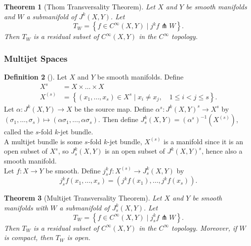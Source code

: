 \documentclass[reqno]{amsart}
\newtheorem{theorem}{Theorem}[section]
\theoremstyle{definition}
\newtheorem{definition}[theorem]{Definition}
\theoremstyle{remark}
\begin{document}
\begin{theorem}[Thom Transversality Theorem]
    Let $X$ and $Y$ be smooth manifolds and
    $W$ a submanifold of $J^{k}(X,Y)$. Let
    \[
    T_W = \left\{ f \in
    C^{\infty}(X,Y)  \mid j^{k}f \pitchfork W \right\} .
    \]
    Then $T_W$ is a residual subset of
    $C^{\infty}(X,Y)$ in the $C^{\infty}$ topology.
\end{theorem}



\subsubsection{Multijet Spaces}

\begin{definition}[]
Let $X$ and $Y$ be smooth manifolds.
Define
\begin{align*}
    X^{s} &= X \times \ldots \times X\\
    X^{(s)}
    &= \left\{ \left( x_1,\ldots,x_s \right)
    \in X^{s}  \mid x_i \neq x_j, \quad 1 \le i <j \le s\right\} .
\end{align*}
Let
$\alpha \colon J^{k}(X,Y) \to X$ be the source map.
Define
$\alpha^s \colon J^{k}(X,Y)^{s} \to X^{s}$
by $\left( \sigma_1,\ldots, \sigma_s \right)
\mapsto \left( \alpha \sigma_1, \ldots,
\alpha \sigma_s \right) $.
Then
define
$J_s^{k}(X,Y) = \left( \alpha^s \right)^{-1}
\left( X^{(s)} \right) $, called the
$s$-fold $k$-jet bundle. \\
A multijet bundle is some
$s$-fold $k$-jet bundle,
$X^{(s)}$ is a manifold since it is an open
subset of $X^{s}$, so
$J_s^{k}(X,Y)$ is an open subset
of
$J^{k}(X,Y)^{s}$, hence also a smooth manifold.\\
Let
$f \colon X \to Y$ be smooth.
Define
$j_s^{k} f \colon X^{(s)}\to
J_{s}^{k}(X,Y)$ by
\[
j_s^{k}f\left( x_1,\ldots, x_s \right)
= \left( j^{k}f(x_1), \ldots,
j^{k}f(x_s) \right).
\]
\end{definition}


\begin{theorem}[Multijet Transversality Theorem]\label{Multijet-Transversality}
    Let $X$ and $Y$ be smooth manifolds with
    $W$ a submanifold of $J_s^{k}(X,Y)$. Let
    \[
    T_W =
    \left\{ f \in C^{\infty}(X,Y) \mid
    j_s^{k}f \pitchfork W \right\} .
    \]
    Then
    $T_W$ is a residual subset of
    $C^{\infty}(X,Y)$ in the
    $C^{\infty}$ topology.
    Moreover, if $W$ is compact, then
    $T_W$ is open.
\end{theorem}
\end{document}
